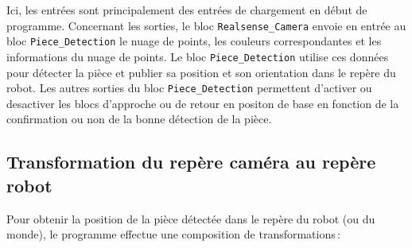 Ici, les entrées sont principalement des entrées de chargement en début de programme. Concernant les sorties, le bloc \texttt{Realsense\_Camera} envoie en entrée au bloc \texttt{Piece\_Detection} le nuage de points, les couleurs correspondantes et les informations du nuage de points. Le bloc \texttt{Piece\_Detection} utilise ces données pour détecter la pièce et publier sa position et son orientation dans le repère du robot. Les autres sorties du bloc \texttt{Piece\_Detection} permettent d'activer ou desactiver les blocs d'approche ou de retour en positon de base en fonction de la confirmation ou non de la bonne détection de la pièce.

\subsection{Transformation du repère caméra au repère robot}

\sloppy

Pour obtenir la position de la pièce détectée dans le repère du robot (ou du monde), le programme effectue une composition de transformations :

